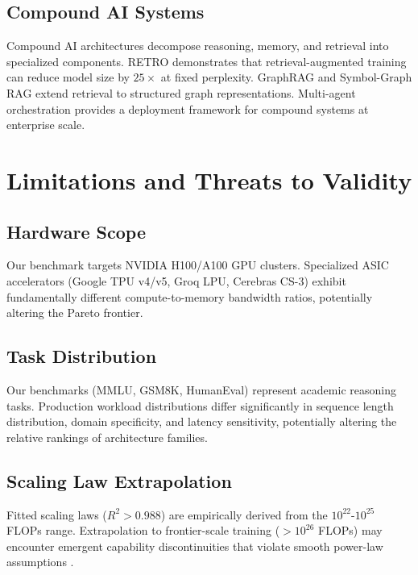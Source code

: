 \documentclass[10pt,journal,compsoc,twocolumn]{IEEEtran}
\begin{document}
\subsection{Compound AI Systems}


Compound AI architectures \cite{arxiv_2406_00584} decompose reasoning, memory, and retrieval into specialized components. RETRO demonstrates that retrieval-augmented training can reduce model size by $25\times$ at fixed perplexity. GraphRAG \cite{arxiv_2501_14050} and Symbol-Graph RAG extend retrieval to structured graph representations. Multi-agent orchestration \cite{arxiv_2404_01131,crossref_10_1109_access_2026_3656309} provides a deployment framework for compound systems at enterprise scale.




\section{Limitations and Threats to Validity}



\subsection{Hardware Scope}


Our benchmark targets NVIDIA H100/A100 GPU clusters. Specialized ASIC accelerators (Google TPU v4/v5, Groq LPU, Cerebras CS-3) exhibit fundamentally different compute-to-memory bandwidth ratios, potentially altering the Pareto frontier.


\subsection{Task Distribution}


Our benchmarks (MMLU, GSM8K, HumanEval) represent academic reasoning tasks. Production workload distributions differ significantly in sequence length distribution, domain specificity, and latency sensitivity, potentially altering the relative rankings of architecture families.


\subsection{Scaling Law Extrapolation}


Fitted scaling laws ($R^2 > 0.988$) are empirically derived from the $10^{22}$-$10^{25}$ FLOPs range. Extrapolation to frontier-scale training ($>10^{26}$ FLOPs) may encounter emergent capability discontinuities that violate smooth power-law assumptions \cite{arxiv_2501_02497}.
\end{document}
